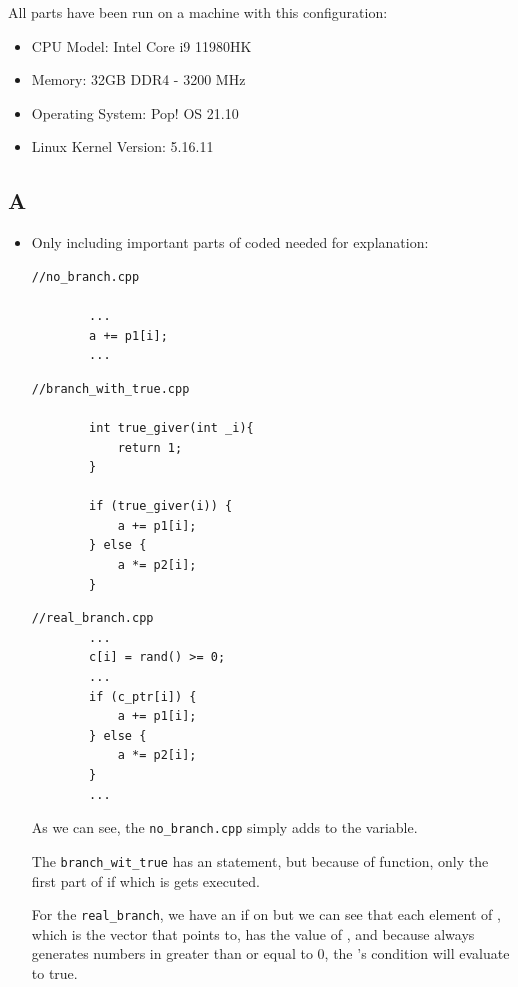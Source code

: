 \documentclass[12pt]{article}
\begin{document}
All parts have been run on a machine with this configuration:

\begin{itemize}
	\item CPU Model: Intel Core i9 11980HK
	\item Memory: 32GB DDR4 - 3200 MHz
	\item Operating System: Pop! OS 21.10
	\item Linux Kernel Version: 5.16.11
\end{itemize}

\subsection{A}


\begin{itemize}
	\item 
	Only including important parts of coded needed for explanation:
	\begin{lstlisting}[style=CStyle]
		//no_branch.cpp
		
		...
		a += p1[i];
		...
	\end{lstlisting}
	
	\begin{lstlisting}[style=CStyle]
		//branch_with_true.cpp
		
		int true_giver(int _i){
			return 1;
		}
		
		if (true_giver(i)) {
			a += p1[i];
		} else {
			a *= p2[i];
		}
	\end{lstlisting}
	
	\begin{lstlisting}[style=CStyle]
		//real_branch.cpp
		...
		c[i] = rand() >= 0;
		...
		if (c_ptr[i]) {
			a += p1[i];
		} else {
			a *= p2[i];
		}
		...
	\end{lstlisting}
	
	As we can see, the \Verb+no_branch.cpp+ simply adds  to the  variable. 
	
	The \Verb+branch_wit_true+ has an  statement, but because of  function, only the first part of if which is  gets executed. 
	
	For the \Verb+real_branch+, we have an if on  but we can see that each element of , which is the vector that  points to, has the value of , and because   always generates numbers in greater than or equal to $0$, the 's condition will evaluate to true.
	

\end{itemize}
\end{document}
